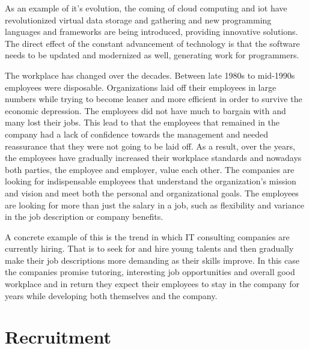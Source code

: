 \documentclass[11pt,a4paper,oneside,article]{memoir}
\begin{document}
As an example of \gls{it}'s evolution, the coming of cloud computing and \gls{iot} have revolutionized virtual data storage and gathering and new programming languages and frameworks are being introduced, providing innovative solutions. The direct effect of the constant advancement of technology is that the software needs to be updated and modernized as well, generating work for programmers.

The workplace has changed over the decades. Between late 1980s to mid-1990s employees were disposable. Organizations laid off their employees in large numbers while trying to become leaner and more efficient in order to survive the economic depression. The employees did not have much to bargain with and many lost their jobs. This lead to that the employees that remained in the company had a lack of confidence towards the management and needed reassurance that they were not going to be laid off. As a result, over the years, the employees have gradually increased their workplace standards and nowadays both parties, the employee and employer, value each other. The companies are looking for indispensable employees that understand the organization's mission and vision and meet both the personal and organizational goals. The employees are looking for more than just the salary in a job, such as flexibility and variance in the job description or company benefits. \cite[p.~20-24, p.~34]{fields:book}

A concrete example of this is the trend in which IT consulting companies are currently hiring. That is to seek for and hire young talents and then gradually make their job descriptions more demanding as their skills improve. In this case the companies promise tutoring, interesting job opportunities and overall good workplace and in return they expect their employees to stay in the company for years while developing both themselves and the company.







\section{Recruitment}
\end{document}
